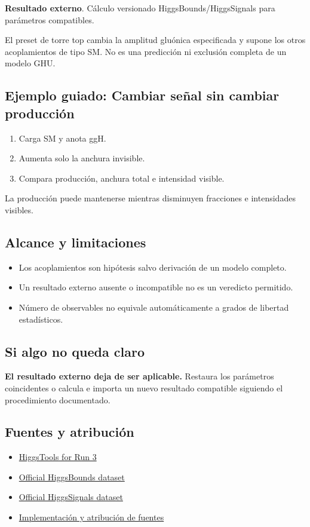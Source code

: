 \documentclass[11pt,a4paper]{article}
\begin{document}
\textbf{Resultado externo}. Cálculo versionado HiggsBounds/HiggsSignals para parámetros compatibles.

El preset de torre top cambia la amplitud gluónica especificada y supone los otros acoplamientos de tipo SM. No es una predicción ni exclusión completa de un modelo GHU.
\subsection*{Ejemplo guiado: Cambiar señal sin cambiar producción}
\begin{enumerate}
\item Carga SM y anota ggH.
\item Aumenta solo la anchura invisible.
\item Compara producción, anchura total e intensidad visible.
\end{enumerate}
La producción puede mantenerse mientras disminuyen fracciones e intensidades visibles.
\subsection*{Alcance y limitaciones}
\begin{itemize}
\item Los acoplamientos son hipótesis salvo derivación de un modelo completo.
\item Un resultado externo ausente o incompatible no es un veredicto permitido.
\item Número de observables no equivale automáticamente a grados de libertad estadísticos.
\end{itemize}
\subsection*{Si algo no queda claro}
\textbf{El resultado externo deja de ser aplicable.} Restaura los parámetros coincidentes o calcula e importa un nuevo resultado compatible siguiendo el procedimiento documentado.

\subsection*{Fuentes y atribución}
\begin{itemize}
\item \href{https://arxiv.org/abs/2608.05401}{HiggsTools for Run 3}
\item \href{https://gitlab.com/higgsbounds/hbdataset}{Official HiggsBounds dataset}
\item \href{https://gitlab.com/higgsbounds/hsdataset}{Official HiggsSignals dataset}
\item \href{https://github.com/karlesmarin/ghu-lab/blob/main/src/modules/higgstools_adapter.mjs}{Implementación y atribución de fuentes}
\end{itemize}
\end{document}

